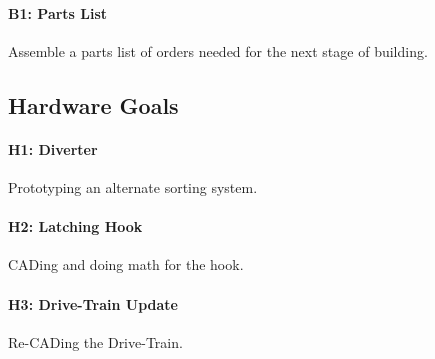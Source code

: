 \documentclass{article}
\begin{document}
\paragraph{B1: Parts List}
 Assemble a parts list of orders needed for the next stage of building.
\subsection{Hardware Goals}
\paragraph{H1: Diverter}
Prototyping an alternate sorting system.
\paragraph{H2: Latching Hook}
 CADing and doing math for the hook.
\paragraph{H3: Drive-Train Update}
 Re-CADing the Drive-Train.
\end{document}
